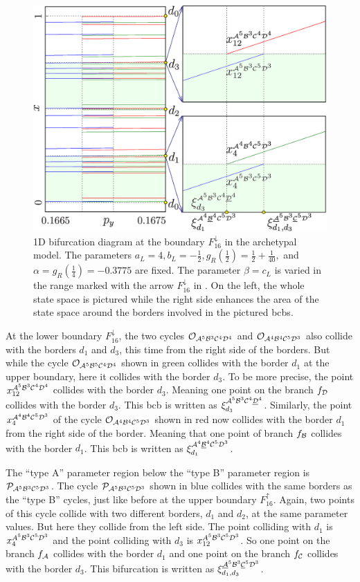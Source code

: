 \begin{figure}
	\centering
	\includegraphics[width=.7 \textwidth]{../Figures/6/6.7/result.png}
	\caption[1D bifurcation diagram at the boundary $F_{16}^\downarrow$ in the archetypal model]{
		1D bifurcation diagram at the boundary $F_{16}^\downarrow$ in the archetypal model.
		The parameters $a_L = 4, b_L = -\frac{1}{2}, g_R\left(\frac{1}{2}\right) = \frac{1}{2} + \frac{1}{40},$ and $\alpha = g_R\left(\frac{1}{4}\right) = -0.3775$ are fixed.
		The parameter $\beta = c_L$ is varied in the range marked with the arrow $F_{16}^\downarrow$ in .
		On the left, the whole state space is pictured while the right side enhances the area of the state space around the borders involved in the pictured \glspl{bcb}.
	}
	\label{fig:arch.bif.F.down}
\end{figure}

At the lower boundary $F_{16}^\downarrow$, the two cycles $\mathcal{O}_{\mathcal{A}^5\mathcal{B}^3\mathcal{C}^4\mathcal{D}^4}$ and $\mathcal{O}_{\mathcal{A}^4\mathcal{B}^4\mathcal{C}^5\mathcal{D}^3}$ also collide with the borders $d_1$ and $d_3$, this time from the right side of the borders.
But while the cycle $\mathcal{O}_{\mathcal{A}^5\mathcal{B}^5\mathcal{C}^4\mathcal{D}^4}$ shown in green collides with the border $d_1$ at the upper boundary, here it collides with the border $d_3$.
To be more precise, the point $x_{12}^{\mathcal{A}^5\mathcal{B}^3\mathcal{C}^4\mathcal{D}^4}$ collides with the border $d_3$.
Meaning one point on the branch $f_{\mathcal{D}}$ collides with the border $d_3$.
This \gls{bcb} is written as $\xi_{d_3}^{\mathcal{A}^5\mathcal{B}^3\mathcal{C}^4\underline{\mathcal{D}}^4}$.
Similarly, the point $x_{4}^{\mathcal{A}^4\mathcal{B}^4\mathcal{C}^5\mathcal{D}^3}$ of the cycle $\mathcal{O}_{\mathcal{A}^4\mathcal{B}^4\mathcal{C}^5\mathcal{D}^3}$ shown in red now collides with the border $d_1$ from the right side of the border.
Meaning that one point of branch $f_{\mathcal{B}}$ collides with the border $d_1$.
This \gls{bcb} is written as $\xi_{d_1}^{\mathcal{A}^4\underline{\mathcal{B}}^4\mathcal{C}^5\mathcal{D}^3}$.

The ``type A'' parameter region below the ``type B'' parameter region is $\mathcal{P}_{\mathcal{A}^5\mathcal{B}^3\mathcal{C}^5\mathcal{D}^3}$.
The cycle $\mathcal{P}_{\mathcal{A}^5\mathcal{B}^3\mathcal{C}^5\mathcal{D}^3}$ shown in blue collides with the same borders as the ``type B'' cycles, just like before at the upper boundary $F_{16}^\uparrow$.
Again, two points of this cycle collide with two different borders, $d_1$ and $d_2$, at the same parameter values.
But here they collide from the left side.
The point colliding with $d_1$ is $x_{4}^{A^5\mathcal{B}^3\mathcal{C}^5\mathcal{D}^3}$ and the point colliding with $d_3$ is $x_{12}^{A^5\mathcal{B}^3\mathcal{C}^5\mathcal{D}^3}$.
So one point on the branch $f_{\mathcal{A}}$ collides with the border $d_1$ and one point on the branch $f_{\mathcal{C}}$ collides with the border $d_3$.
This bifurcation is written as $\xi_{d_1, d_3}^{\underline{\mathcal{A}}^5\mathcal{B}^3\underline{\mathcal{C}}^5\mathcal{D}^3}$.

